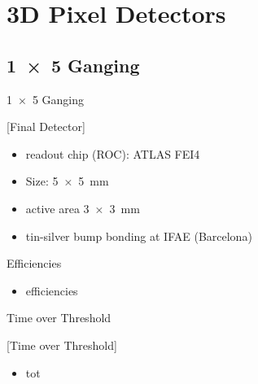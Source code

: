 \section{3D Pixel Detectors}
\subsection{\SI{1x5}{} Ganging}
\begin{frame}{\SI{1x5}{} Ganging}

	[Final Detector]	
	
	\begin{itemize}\itemfill
		\item readout chip (ROC): ATLAS FEI4
		\item Size: \SI{5x5}{\milli\meter}
		\item active area \SI{3x3}{\milli\meter}
		\item tin-silver bump bonding at IFAE (Barcelona)
	\end{itemize}
	
\end{frame}
\begin{frame}{Efficiencies}

	
	\begin{itemize}\itemfill
		\item efficiencies
	\end{itemize}
	
\end{frame}
\begin{frame}{Time over Threshold}

	[Time over Threshold]	
	
	\begin{itemize}\itemfill
		\item tot
	\end{itemize}
	
\end{frame}
